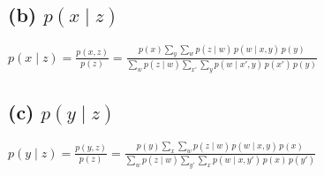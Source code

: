 \documentclass[11pt]{article}
\begin{document}
\subsection*{(b) $p(x\mid z)$}
%
$p(x\mid z) = \frac{p(x,z)}{p(z)} = \frac{p(x)\sum_{y}\sum_{w} p(z\mid w)\,p(w\mid x,y)\,p(y)}{\sum_w p(z\mid w)\sum_{x'}\sum_y p(w\mid x',y)\,p(x')\,p(y)}$

\subsection*{(c) $p(y\mid z)$}
$p(y\mid z) = \frac{p(y,z)}{p(z)} = \frac{p(y)\sum_{x}\sum_{w} p(z\mid w)\,p(w\mid x,y)\,p(x)}{\sum_w p(z\mid w)\sum_{y'}\sum_x p(w\mid x,y')\,p(x)\,p(y')}$
\end{document}
